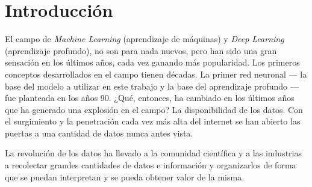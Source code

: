 
\section{Introducción}

El campo de \emph{Machine Learning} (aprendizaje de máquinas) y \emph{Deep Learning} (aprendizaje profundo), no son para nada nuevos, pero han sido una gran sensación en los últimos años, cada vez ganando más popularidad. Los primeros conceptos desarrollados en el campo tienen décadas. La primer red neuronal --- la base del modelo a utilizar en este trabajo y la base del aprendizaje profundo --- fue planteada en los años 90. ¿Qué, entonces, ha cambiado en los últimos años que ha generado una explosión en el campo? La disponibilidad de los datos. Con el surgimiento y la penetración cada vez más alta del internet se han abierto las puertas a una cantidad de datos nunca antes vista.

La revolución de los datos ha llevado a la comunidad científica y a las industrias a recolectar grandes cantidades de datos e información y organizarlos de forma que se puedan interpretan y se pueda obtener valor de la misma.



